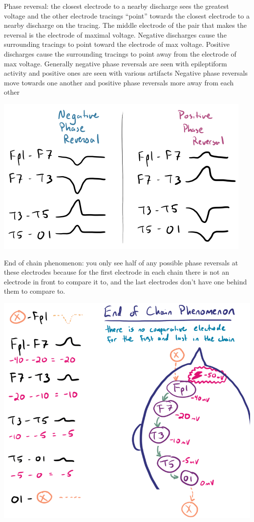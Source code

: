 \documentclass[12pt]{article}
\begin{document}
Phase reversal: the closest electrode to a nearby discharge sees the greatest voltage and the other electrode tracings “point” towards the closest electrode to a nearby discharge on the tracing.
The middle electrode of the pair that makes the reversal is the electrode of maximal voltage.
Negative discharges cause the surrounding tracings to point toward the electrode of max voltage.
Positive discharges cause the surrounding tracings to point away from the electrode of max voltage. 
Generally negative phase reversals are seen with epileptiform activity and positive ones are seen with various artifacts
Negative phase reversals move towards one another and positive phase reversals more away from each other

\includegraphics[scale=0.4]{phaseReversals}

End of chain phenomenon: you only see half of any possible phase reversals at these electrodes because for the first electrode in each chain there is not an electrode in front to compare it to, and the last electrodes don’t have one behind them to compare to.

\includegraphics[scale=0.4]{EndOfChain}
\end{document}

